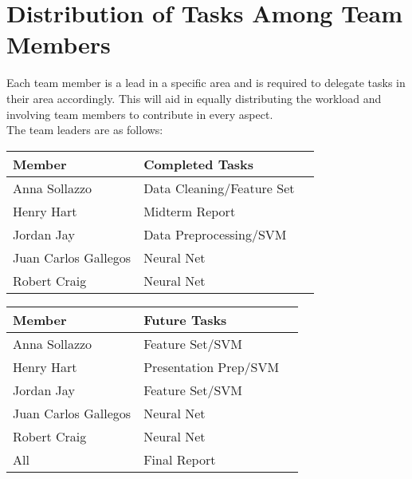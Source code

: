\documentclass[journal]{IEEEtran}
\begin{document}

\section{Distribution of Tasks Among Team Members}

Each team member is a lead in a specific area and is required to delegate tasks in their area accordingly. This will aid in equally distributing the workload and involving team members to contribute in every aspect.\\

The team leaders are as follows:

\begin{table}[h!]
    \label{tab:table1}
    \begin{tabular}{l|l|l|}
      \textbf{Member} & \textbf{Completed Tasks}\\

      \hline
	Anna Sollazzo & Data Cleaning/Feature Set\\
	Henry Hart & Midterm Report\\
	Jordan Jay & Data Preprocessing/SVM\\
	Juan Carlos Gallegos & Neural Net\\
	Robert Craig & Neural Net\\

    \end{tabular}
\end{table}

\begin{table}[h!]
    \label{tab:table1}
    \begin{tabular}{l|l|l|}
      \textbf{Member} & \textbf{Future Tasks}\\

      \hline
	Anna Sollazzo & Feature Set/SVM\\
	Henry Hart & Presentation Prep/SVM\\
	Jordan Jay & Feature Set/SVM\\
	Juan Carlos Gallegos & Neural Net\\
	Robert Craig & Neural Net\\
	All & Final Report

    \end{tabular}
\end{table}

\end{document}

